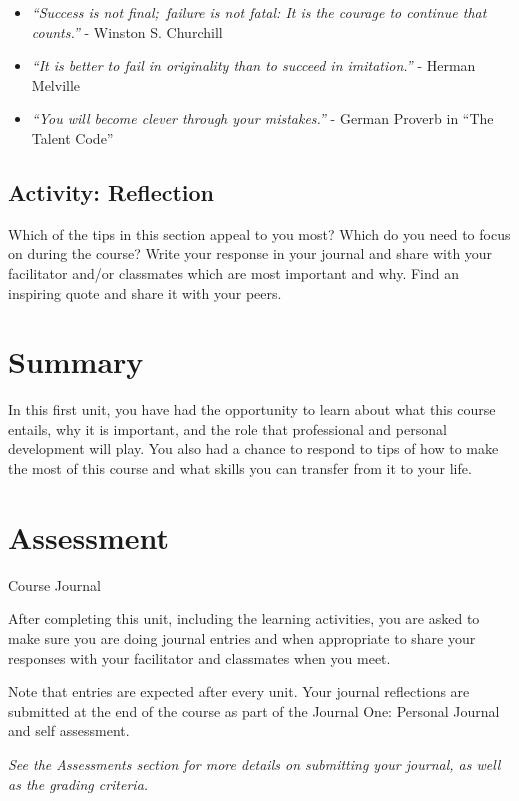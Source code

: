 \documentclass[
]{book}
\begin{document}
\begin{itemize}
\item
  \emph{``Success is not final;~failure is not fatal: It is the courage to continue that counts.''} - Winston S. Churchill
\item
  \emph{``It is better to fail in originality than to succeed in imitation.''} - Herman Melville
\item
  \emph{``You will become clever through your mistakes.''} - German Proverb in ``The Talent Code''
\end{itemize}

\hypertarget{activity-reflection}{%
\subsection*{Activity: Reflection}\label{activity-reflection}}

\begin{reflect}
Which of the tips in this section appeal to you most? Which do you need to focus on during the course? Write your response in your journal and share with your facilitator and/or classmates which are most important and why. Find an inspiring quote and share it with your peers.
\end{reflect}

\hypertarget{summary}{%
\section*{Summary}\label{summary}}

In this first unit, you have had the opportunity to learn about what this course entails, why it is important, and the role that professional and personal development will play. You also had a chance to respond to tips of how to make the most of this course and what skills you can transfer from it to your life.

\hypertarget{assessment-1}{%
\section*{Assessment}\label{assessment-1}}

\begin{assessment}
{Course Journal}

After completing this unit, including the learning activities, you are asked to make sure you are doing journal entries and when appropriate to share your responses with your facilitator and classmates when you meet.

Note that entries are expected after every unit. Your journal reflections are submitted at the end of the course as part of the Journal One: Personal Journal and self assessment.

\emph{See the Assessments section for more details on submitting your journal, as well as the grading criteria.}
\end{assessment}
\end{document}
